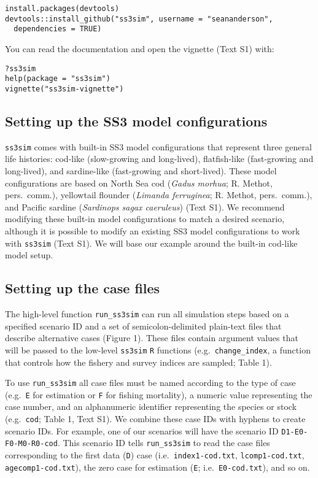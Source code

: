 \documentclass[11pt]{article}
\begin{document}
\begin{verbatim}
install.packages(devtools)
devtools::install_github("ss3sim", username = "seananderson",
  dependencies = TRUE)
\end{verbatim}

\noindent
You can read the documentation and open the vignette (Text S1) with:

\begin{verbatim}
?ss3sim
help(package = "ss3sim")
vignette("ss3sim-vignette")
\end{verbatim}

\subsection*{Setting up the SS3 model configurations}

\texttt{ss3sim} comes with built-in SS3 model configurations that represent three general life histories: cod-like (slow-growing and long-lived), flatfish-like (fast-growing and long-lived), and sardine-like (fast-growing and short-lived). These model configurations are based on North Sea cod (\emph{Gadus morhua}; R. Methot, pers.~comm.), yellowtail flounder (\emph{Limanda ferruginea}; R. Methot, pers.~comm.), and Pacific sardine (\emph{Sardinops sagax caeruleus}) \cite{hill2012} (Text S1). We recommend modifying these built-in model configurations to match a desired scenario, although it is possible to modify an existing SS3 model configurations to work with \texttt{ss3sim} (Text S1). We will base our example around the built-in cod-like model setup.

\subsection*{Setting up the case files}

The high-level function \texttt{run\_ss3sim} can run all simulation steps based on a specified scenario ID and a set of semicolon-delimited plain-text files that describe alternative cases (Figure 1). These files contain argument values that will be passed to the low-level \texttt{ss3sim} \texttt{R} functions (e.g.~\texttt{change\_index}, a function that controls how the fishery and survey indices are sampled; Table 1).

To use \texttt{run\_ss3sim} all case files must be named according to the type of case (e.g.~\texttt{E} for estimation or \texttt{F} for fishing mortality), a numeric value representing the case number, and an alphanumeric identifier representing the species or stock (e.g.~\texttt{cod}; Table 1, Text S1). We combine these case IDs with hyphens to create scenario IDs. For example, one of our scenarios will have the scenario ID \texttt{D1-E0-F0-M0-R0-cod}. This scenario ID tells \texttt{run\_ss3sim} to read the case files corresponding to the first data (\texttt{D}) case (i.e.~\texttt{index1-cod.txt}, \texttt{lcomp1-cod.txt}, \texttt{agecomp1-cod.txt}), the zero case for estimation (\texttt{E}; i.e.~\texttt{E0-cod.txt}), and so on.
\end{document}
